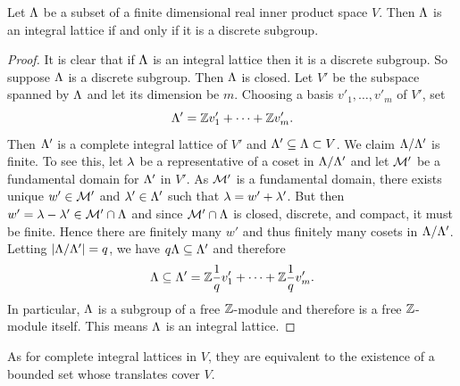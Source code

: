     \begin{proposition}\label{prop:lattice_if_and_only_if_discrete_subgroup}
      Let \(\Lambda\) be a subset of a finite dimensional real inner product space \(V\). Then \(\Lambda\) is an integral lattice if and only if it is a discrete subgroup.
    \end{proposition}
    \begin{proof}
      It is clear that if \(\Lambda\) is an integral lattice then it is a discrete subgroup. So suppose \(\Lambda\) is a discrete subgroup. Then \(\Lambda\) is closed. Let \(V'\) be the subspace spanned by \(\Lambda\) and let its dimension be \(m\). Choosing a basis \(v'_{1},\ldots,v'_{m}\) of \(V'\), set
      \[
        \Lambda' = \mathbb{Z} v'_{1}+\cdots+\mathbb{Z} v'_{m}.
      \]
      Then \(\Lambda'\) is a complete integral lattice of \(V'\) and \(\Lambda' \subseteq \Lambda \subset V\). We claim \(\Lambda/\Lambda'\) is finite. To see this, let \(\lambda\) be a representative of a coset in \(\Lambda/\Lambda'\) and let \(\mathcal{M}'\) be a fundamental domain for \(\Lambda'\) in \(V'\). As \(\mathcal{M}'\) is a fundamental domain, there exists unique \(w' \in \mathcal{M}'\) and \(\lambda' \in \Lambda'\) such that \(\lambda = w'+\lambda'\). But then \(w' = \lambda-\lambda' \in \mathcal{M}' \cap \Lambda\) and since \(\mathcal{M}' \cap \Lambda\) is closed, discrete, and compact, it must be finite. Hence there are finitely many \(w'\) and thus finitely many cosets in \(\Lambda/\Lambda'\). Letting \(|\Lambda/\Lambda'| = q\), we have \(q\Lambda \subseteq \Lambda'\) and therefore
      \[
        \Lambda \subseteq \Lambda' = \mathbb{Z}\frac{1}{q}v'_{1}+\cdots+\mathbb{Z}\frac{1}{q}v'_{m}.
      \]
      In particular, \(\Lambda\) is a subgroup of a free \(\mathbb{Z}\)-module and therefore is a free \(\mathbb{Z}\)-module itself. This means \(\Lambda\) is an integral lattice.
    \end{proof}

    As for complete integral lattices in \(V\), they are equivalent to the existence of a bounded set whose translates cover \(V\).

